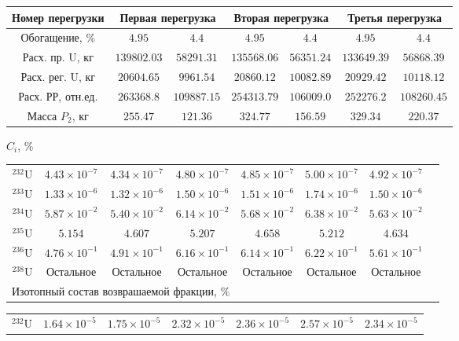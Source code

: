 \begin{table}
\begin{tabular}{|c|c|c|c|c|c|c|}
    \hline \multicolumn{1}{c|}{ Номер перегрузки } & \multicolumn{2}{|c|}{ Первая перегрузка } & \multicolumn{2}{c|}{ Вторая перегрузка } & \multicolumn{2}{|c}{ Третья перегрузка } \\
    \hline Обогащение, $\%$ & $4.95$ & $4.4$ & $4.95$ & $4.4$ & $4.95$ & $4.4$ \\
    Расх. пр. U, кг & $139802.03$ & $58291.31$ & $135568.06$ & $56351.24$ & $133649.39$ & $56868.39$ \\
    Расх. рег. U, кг & $20604.65$ & $9961.54$ & $20860.12$ & $10082.89$ & $20929.42$ & $10118.12$ \\
    Расх. РР, отн.ед. & $263368.8$ & $109887.15$ & $254313.79$ & $106009.0$ & $252276.2$ & $108260.45$ \\
    Масса $P_2$, кг & $255.47$ & $121.36$ & $324.77$ & $156.59$ & $329.34$ & $220.37$ \\
    \hline
    \end{tabular}
    $C_i$, \%
    \begin{tabular}{c|c|c|c|c|c|c|c}
    \hline${ }^{232} \mathrm{U}$ & $4.43 \times 10^{-7}$ & $4.34 \times 10^{-7}$ & $4.80 \times 10^{-7}$ & $4.85 \times 10^{-7}$ & $5.00 \times 10^{-7}$ & $4.92 \times 10^{-7}$ \\
    ${ }^{233} \mathrm{U}$ & $1.33 \times 10^{-6}$ & $1.32 \times 10^{-6}$ & $1.50 \times 10^{-6}$ & $1.51 \times 10^{-6}$ & $1.74 \times 10^{-6}$ & $1.50 \times 10^{-6}$ \\
    ${ }^{234} \mathrm{U}$ & $5.87 \times 10^{-2}$ & $5.40 \times 10^{-2}$ & $6.14 \times 10^{-2}$ & $5.68 \times 10^{-2}$ & $6.38 \times 10^{-2}$ & $5.63 \times 10^{-2}$ \\
    ${ }^{235} \mathrm{U}$ & $5.154$ & $4.607$ & $5.207$ & $4.658$ & $5.212$ & $4.634$ \\
    ${ }^{236} \mathrm{U}$ & $4.76 \times 10^{-1}$ & $4.91 \times 10^{-1}$ & $6.16 \times 10^{-1}$ & $6.14 \times 10^{-1}$ & $6.22 \times 10^{-1}$ & $5.61 \times 10^{-1}$ \\
    ${ }^{238} \mathrm{U}$ & Остальное & Остальное & Остальное & Остальное & Остальное & Остальное \\
    \hline \multicolumn{4}{|c|}{ Изотопный состав возврашаемой фракции, $\%$}
    \end{tabular}
    \begin{tabular}{|c|c|c|c|c|c|c|}
    \hline ${ }^{232} \mathrm{U}$ & $1.64 \times 10^{-5}$ & $1.75 \times 10^{-5}$ & $2.32 \times 10^{-5}$ & $2.36 \times 10^{-5}$ & $2.57 \times 10^{-5}$ & $2.34 \times 10^{-5}$ \\

\end{tabular}
\end{table}

